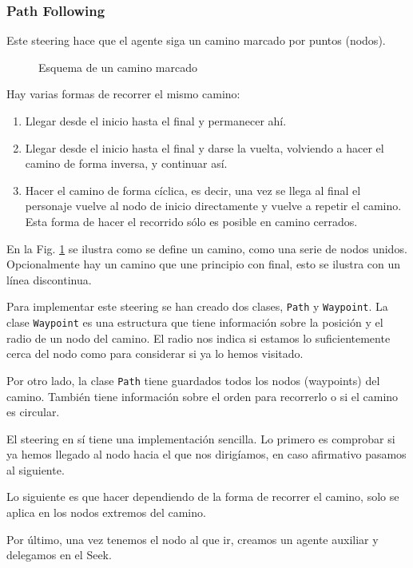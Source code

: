 \subsubsection{Path Following}

Este steering hace que el agente siga un camino marcado por puntos (nodos).

\begin{figure}[H]
    \centering
    \resizebox{0.25\textwidth}{!}{
        
    }
    \caption{Esquema de un camino marcado}
    \label{fig:pathFollowing}
\end{figure}

Hay varias formas de recorrer el mismo camino:
\begin{enumerate}
    \item Llegar desde el inicio hasta el final y permanecer ahí.
    \item Llegar desde el inicio hasta el final y darse la vuelta, volviendo a hacer el camino de forma inversa, y continuar así.
    \item Hacer el camino de forma cíclica, es decir, una vez se llega al final el personaje vuelve al nodo de inicio directamente y vuelve a repetir el camino. Esta forma de hacer el recorrido sólo es posible en camino cerrados.
\end{enumerate}

En la Fig. \ref{fig:pathFollowing} se ilustra como se define un camino, como una serie de nodos unidos. Opcionalmente hay un camino que une principio con final, esto se ilustra con un línea discontinua.

Para implementar este steering se han creado dos clases, \texttt{Path} y \texttt{Waypoint}. La clase \texttt{Waypoint} es una estructura que tiene información sobre la posición y el radio de un nodo del camino. El radio nos indica si estamos lo suficientemente cerca del nodo como para considerar si ya lo hemos visitado.

Por otro lado, la clase \texttt{Path} tiene guardados todos los nodos (waypoints) del camino. También tiene información sobre el orden para recorrerlo o si el camino es circular.

El steering en sí tiene una implementación sencilla. Lo primero es comprobar si ya hemos llegado al nodo hacia el que nos dirigíamos, en caso afirmativo pasamos al siguiente.



Lo siguiente es que hacer dependiendo de la forma de recorrer el camino, solo se aplica en los nodos extremos del camino.



Por último, una vez tenemos el nodo al que ir, creamos un agente auxiliar y delegamos en el Seek.




